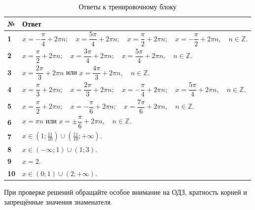 \documentclass[a4paper,12pt]{article}
\renewcommand{\arraystretch}{1.3}
\begin{document}
\begin{table}[ht]
\centering
\caption{Ответы к тренировочному блоку}
\renewcommand{\arraystretch}{1.45}
\begin{tabularx}{\linewidth}{@{}>{\bfseries}p{1.1cm}X@{}}
\toprule
№ & Ответ \\
\midrule

1 &
\(
x=-\dfrac{\pi}{4}+2\pi n;
\quad
x=\dfrac{5\pi}{4}+2\pi n;
\quad
x=\dfrac{\pi}{2}+2\pi n;
\quad
x=-\dfrac{\pi}{2}+2\pi n,
\quad n\in\mathbb Z.
\)
\\

2 &
\(
x=\dfrac{\pi}{2}+2\pi n;
\quad
x=\dfrac{3\pi}{4}+2\pi n;
\quad
x=\dfrac{5\pi}{4}+2\pi n,
\quad n\in\mathbb Z.
\)
\\

3 &
\(
x=\dfrac{2\pi}{3}+2\pi n
\)
или
\(
x=\dfrac{4\pi}{3}+2\pi n,
\quad n\in\mathbb Z.
\)
\\

4 &
\(
x=\dfrac{\pi}{3}+2\pi n;
\quad
x=\dfrac{2\pi}{3}+2\pi n;
\quad
x=-\dfrac{\pi}{4}+2\pi n;
\quad
x=\dfrac{5\pi}{4}+2\pi n,
\quad n\in\mathbb Z.
\)
\\

5 &
\(
x=\dfrac{\pi}{2}+2\pi n;
\quad
x=-\dfrac{\pi}{6}+2\pi n;
\quad
x=\dfrac{7\pi}{6}+2\pi n,
\quad n\in\mathbb Z.
\)
\\

6 &
\(
x=\pi n
\)
или
\(
x=\pm\dfrac{\pi}{6}+2\pi n,
\quad n\in\mathbb Z.
\)
\\

7 &
\(
\displaystyle
x\in
\left(1;\frac{11}{10}\right)
\cup
\left(\frac{11}{10};+\infty\right).
\)
\\

8 &
\(
x\in(-\infty;1)\cup(1;3).
\)
\\

9 &
\(
x=2.
\)
\\

10 &
\(
x\in(0;1)\cup(2;+\infty).
\)
\\

\bottomrule
\end{tabularx}
\end{table}

\vfill

\begin{center}
\textcolor{softgray}{
\small
При проверке решений обращайте особое внимание на ОДЗ,
кратность корней и запрещённые значения знаменателя.
}
\end{center}
\end{document}
